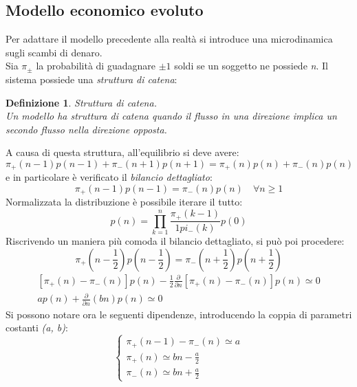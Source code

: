 \documentclass[12pt, a4paper]{book}
\theoremstyle{theorem}
\newtheorem{definition}{Definizione}[section]
\begin{document}
			\subsection{Modello economico evoluto}
				Per adattare il modello precedente alla realtà si introduce una microdinamica sugli scambi di denaro.\\
				Sia $\pi_\pm$ la probabilità di guadagnare $\pm 1$ soldi se un soggetto ne possiede \textit{n}. Il sistema possiede una \textit{struttura di catena}:
				\begin{definition}
					Struttura di catena.\\
					Un modello ha struttura di catena quando il flusso in una direzione implica un secondo flusso nella direzione opposta.
				\end{definition}
				A causa di questa struttura, all'equilibrio si deve avere:
				\begin{equation}
					\pi_+(n-1)p(n-1)+\pi_-(n+1)p(n+1)=\pi_+(n)p(n)+\pi_-(n)p(n)
				\end{equation}
				e in particolare è verificato il \textit{bilancio dettagliato}:
				\begin{equation}
					\pi_+(n-1)p(n-1)=\pi_-(n)p(n)\quad \forall n\geq 1
				\end{equation}
				Normalizzata la distribuzione è possibile iterare il tutto:
				\begin{equation}
					p(n)=\prod_{k=1}^n\frac{\pi_+(k-1)}{1pi_-(k)}p(0)
				\end{equation}
				Riscrivendo un maniera più comoda il bilancio dettagliato, si può poi procedere:
				\begin{equation}
					\pi_+(n-\frac{1}{2})p(n-\frac{1}{2})=\pi_-(n+\frac{1}{2})p(n+\frac{1}{2})
				\end{equation}
				\begin{equation}
					\begin{split}
						[\pi_+(n)-\pi_-(n)]p(n)-\frac{1}{2}\frac{\partial}{\partial n}[\pi_+(n)-\pi_-(n)]p(n)\simeq 0\\
						ap(n)+\frac{\partial}{\partial n}(bn)p(n)\simeq 0
					\end{split}
				\end{equation}
				Si possono notare ora le seguenti dipendenze, introducendo la coppia di parametri costanti \textit{(a, b)}:
				\begin{equation}
					\begin{cases}
						\pi_+(n-1)-\pi_-(n)\simeq a\\
						\pi_+(n)\simeq bn-\frac{a}{2}\\
						\pi_-(n)\simeq bn+\frac{a}{2}
					\end{cases}
				\end{equation}
\end{document}
